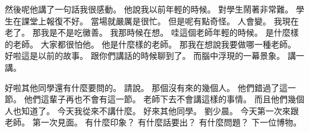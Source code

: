 \hypertarget{w01:cue:3664}{}然後呢他講了一句話我很感動。
\hypertarget{w01:cue:3665}{}他說我以前年輕的時候。
\hypertarget{w01:cue:3666}{}對學生鬧著非常難。
\hypertarget{w01:cue:3667}{}學生在課堂上報復不好。
\hypertarget{w01:cue:3668}{}當場就嚴厲是很忙。
\hypertarget{w01:cue:3669}{}但是呢有點奇怪。
\hypertarget{w01:cue:3670}{}人會變。
\hypertarget{w01:cue:3671}{}我現在老了。
\hypertarget{w01:cue:3672}{}那我是不是吃黴善。
\hypertarget{w01:cue:3673}{}我那時候在想。
\hypertarget{w01:cue:3674}{}哇這個老師年輕的時候。
\hypertarget{w01:cue:3675}{}是什麼樣的老師。
\hypertarget{w01:cue:3676}{}大家都很怕他。
\hypertarget{w01:cue:3677}{}他是什麼樣的老師。
\hypertarget{w01:cue:3678}{}那我在想說我要做哪一種老師。
\hypertarget{w01:cue:3679}{}好啦這是以前的故事。
\hypertarget{w01:cue:3680}{}跟你們講話的時候聊到了。
\hypertarget{w01:cue:3681}{}而腦中浮現的一幕景象。
\hypertarget{w01:cue:3682}{}講一講。

\hypertarget{w01:cue:3683}{}好啦其他同學還有什麼要問的。
\hypertarget{w01:cue:3684}{}請說。
\hypertarget{w01:cue:3685}{}那個沒有來的幾個人。
\hypertarget{w01:cue:3686}{}他們錯過了這一節。
\hypertarget{w01:cue:3687}{}他們這輩子再也不會有這一節。
\hypertarget{w01:cue:3688}{}老師下去不會講這樣的事情。
\hypertarget{w01:cue:3689}{}而且他們幾個人也知道了。
\hypertarget{w01:cue:3690}{}今天我從來不講什麼。
\hypertarget{w01:cue:3691}{}好來其他同學。
\hypertarget{w01:cue:3692}{}劉少晨。
\hypertarget{w01:cue:3693}{}今天第一次來跟老師。
\hypertarget{w01:cue:3694}{}第一次見面。
\hypertarget{w01:cue:3695}{}有什麼印象？
\hypertarget{w01:cue:3696}{}有什麼話要出？
\hypertarget{w01:cue:3697}{}有什麼問題？
\hypertarget{w01:cue:3698}{}下一位博物。

